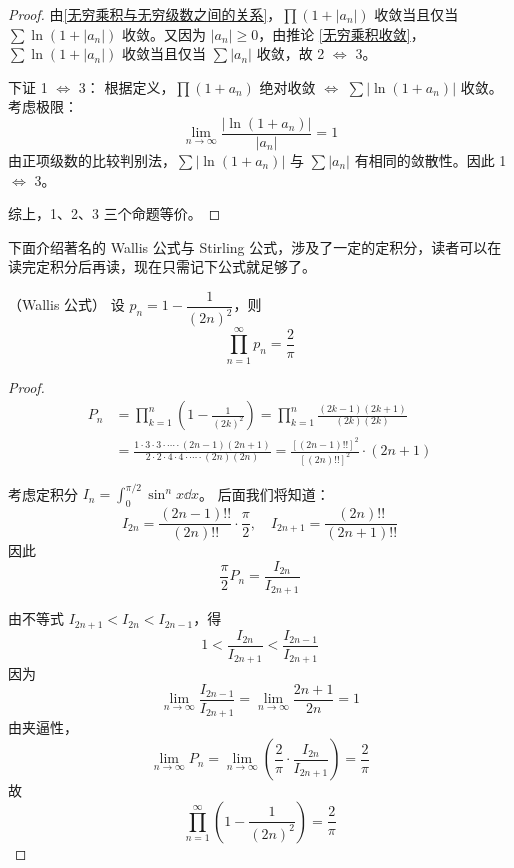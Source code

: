 \begin{proof}
	由\ref{无穷乘积与无穷级数之间的关系}，$\prod(1 + |a_n|)$ 收敛当且仅当 $\sum \ln(1 + |a_n|)$ 收敛。又因为 $|a_n| \ge 0$，由推论 \ref{无穷乘积收敛}，$\sum \ln(1 + |a_n|)$ 收敛当且仅当 $\sum |a_n|$ 收敛，故 2 $\iff$ 3。
	
	下证 1 $\iff$ 3：
	根据定义，$\prod(1 + a_n)$ 绝对收敛 $\iff$ $\sum |\ln(1 + a_n)|$ 收敛。
	考虑极限：
	\[
	\lim_{n \to \infty} \frac{|\ln(1 + a_n)|}{|a_n|} = 1
	\]
	由正项级数的比较判别法，$\sum |\ln(1 + a_n)|$ 与 $\sum |a_n|$ 有相同的敛散性。因此 1 $\iff$ 3。
	
	综上，1、2、3 三个命题等价。
\end{proof}

下面介绍著名的 Wallis 公式与 Stirling 公式，涉及了一定的定积分，读者可以在读完定积分后再读，现在只需记下公式就足够了。
\begin{proposition}（Wallis 公式）
	设 \( p_n = 1 - \dfrac{1}{(2n)^2} \)，则
	\[
	\prod_{n=1}^{\infty} p_n = \frac{2}{\pi}
	\]
\end{proposition}
\begin{proof}
	\[
	\begin{aligned}
		P_n &= \prod_{k=1}^{n} \left(1 - \frac{1}{(2k)^2}\right)
		= \prod_{k=1}^{n} \frac{(2k-1)(2k+1)}{(2k)(2k)} \\
		&= \frac{1 \cdot 3 \cdot 3 \cdot \cdots \cdot (2n-1)(2n+1)}{2 \cdot 2 \cdot 4 \cdot 4 \cdot \cdots \cdot (2n)(2n)}
		= \frac{[(2n-1)!!]^2}{[(2n)!!]^2} \cdot (2n+1)
	\end{aligned}
	\]
	
	考虑定积分 \( I_n = \displaystyle\int_{0}^{\pi/2} \sin^n x \dd x \)。
	后面我们将知道：
	\[
	I_{2n} = \frac{(2n-1)!!}{(2n)!!} \cdot \frac{\pi}{2}, \quad I_{2n+1} = \frac{(2n)!!}{(2n+1)!!}
	\]
	因此
	\[
	\frac{\pi}{2} P_n = \frac{I_{2n}}{I_{2n+1}}
	\]
	
	由不等式 \( I_{2n+1} < I_{2n} < I_{2n-1} \)，得
	\[
	1 < \frac{I_{2n}}{I_{2n+1}} < \frac{I_{2n-1}}{I_{2n+1}}
	\]
	因为
	\[
	\lim_{n \to \infty} \frac{I_{2n-1}}{I_{2n+1}} = \lim_{n \to \infty} \frac{2n+1}{2n} = 1
	\]
	由夹逼性，
	\[
	\lim_{n \to \infty} P_n = \lim_{n \to \infty} \left( \frac{2}{\pi} \cdot \frac{I_{2n}}{I_{2n+1}} \right) = \frac{2}{\pi}
	\]
	故
	\[
	\prod_{n=1}^{\infty} \left(1 - \frac{1}{(2n)^2}\right) = \frac{2}{\pi}
	\]
\end{proof}


